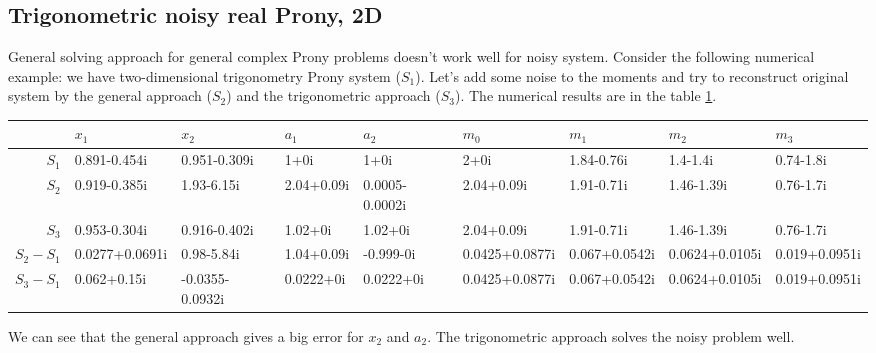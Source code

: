\subsection{Trigonometric noisy real Prony, 2D}

General solving approach for general complex Prony problems doesn't work well for noisy system. Consider the following numerical example: we have two-dimensional trigonometry Prony system ($S_1$). Let's add some noise to the moments and try to reconstruct original system by the general approach ($S_2$) and the trigonometric approach ($S_3$).
The numerical results are in the table \ref{tbl:noisy}.

\begin{table}
\label{tbl:noisy}
\centering
\begin{tabular}{rllllllll}
  \hline
 & $x_1$ & $x_2$ & $a_1$ & $a_2$ & $m_0$ & $m_1$ & $m_2$ & $m_3$ \\ 
  \hline
  $S_1$ & 0.891-0.454i & 0.951-0.309i & 1+0i & 1+0i & 2+0i & 1.84-0.76i & 1.4-1.4i & 0.74-1.8i \\ 
  $S_2$ & 0.919-0.385i & 1.93-6.15i & 2.04+0.09i & 0.0005-0.0002i & 2.04+0.09i & 1.91-0.71i & 1.46-1.39i & 0.76-1.7i \\ 
  $S_3$ & 0.953-0.304i & 0.916-0.402i & 1.02+0i & 1.02+0i & 2.04+0.09i & 1.91-0.71i & 1.46-1.39i & 0.76-1.7i \\ 
  $S_2-S_1$ & 0.0277+0.0691i & 0.98-5.84i & 1.04+0.09i & -0.999-0i & 0.0425+0.0877i & 0.067+0.0542i & 0.0624+0.0105i & 0.019+0.0951i \\ 
  $S_3-S_1$ & 0.062+0.15i & -0.0355-0.0932i & 0.0222+0i & 0.0222+0i & 0.0425+0.0877i & 0.067+0.0542i & 0.0624+0.0105i & 0.019+0.0951i \\ 
   \hline
\end{tabular}
\end{table}
  
We can see that the general approach gives a big error for $x_2$ and $a_2$. The trigonometric approach solves the noisy problem well.